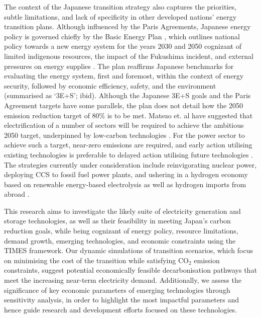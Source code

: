 
The context of the Japanese transition strategy also captures the priorities, subtle limitations, and lack of specificity in other developed nations' energy transition plans. Although influenced by the Paris Agreements, Japanese energy policy is governed chiefly by the Basic Energy Plan \cite{noauthor_basic_2017}, which outlines national policy towards a new energy system for the years 2030 and 2050 cognizant of limited indigenous resources, the impact of the Fukushima incident, and external pressures on energy supplies \cite{meti_annual_2018}. The plan reaffirms Japanese benchmarks for evaluating the energy system, first and foremost, within the context of energy security, followed by economic efficiency, safety, and the environment (summarised as `3E+S'; ibid). Although the Japanese 3E+S goals and the Paris Agreement targets have some parallels, the plan does not detail how the 2050 emission reduction target of 80\% is to be met. Matsuo et. al have suggested that electrification of a number of sectors will be required to achieve the ambitious 2050 target, underpinned by low-carbon technologies \cite{matsuo_quantitative_2018}. For the power sector to achieve such a target, near-zero emissions are required, and early action utilising existing technologies is preferable to delayed action utilising future technologies \cite{ashina_roadmap_2012}. The strategies currently under consideration include reinvigorating nuclear power, deploying \gls{CCS} to fossil fuel power plants, and ushering in a hydrogen economy based on renewable energy-based electrolysis \cite{ashina_roadmap_2012, matsuo_quantitative_2018} as well as hydrogen imports from abroad \cite{noauthor_basic_2017}. 

This research aims to investigate the likely suite of electricity generation and storage technologies, as well as their feasibility in meeting Japan's carbon reduction goals, while being cognizant of energy policy, resource limitations, demand growth, emerging technologies, and economic constraints using the \gls{TIMES} framework. Our dynamic simulations of transition scenarios, which focus on minimising the cost of the transition while satisfying CO$_2$ emission constraints, suggest potential economically feasible decarbonisation pathways that meet the increasing near-term electricity demand. Additionally, we assess the significance of key economic parameters of emerging technologies through sensitivity analysis, in order to highlight the most impactful parameters and hence guide research and development efforts focused on these technologies.
